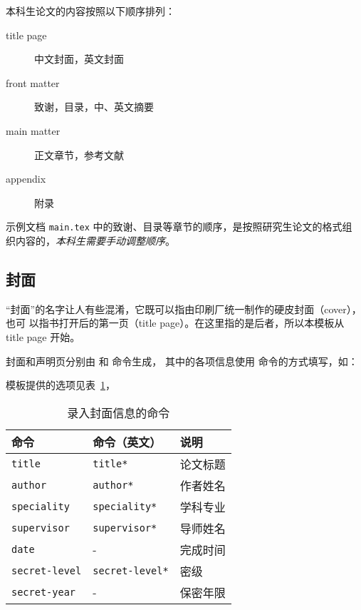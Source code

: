 \documentclass[a4paper]{ltxdoc}
\DeclareRobustCommand\file{\nolinkurl}
\DeclareRobustCommand\opt{\texttt}
\begin{document}
本科生论文的内容按照以下顺序排列：
\begin{description}
  \item[title page] 中文封面，英文封面
  \item[front matter] 致谢，目录，中、英文摘要
  \item[main matter] 正文章节，参考文献
  \item[appendix] 附录
\end{description}

示例文档 \file{main.tex} 中的致谢、目录等章节的顺序，是按照研究生论文的格式组
织内容的，\emph{本科生需要手动调整顺序}。


\subsection{封面}

“封面”的名字让人有些混淆，它既可以指由印刷厂统一制作的硬皮封面（cover），也可
以指书打开后的第一页（title page）。在这里指的是后者，所以本模板从 title page
开始。

\DescribeMacro{\maketitle}
\DescribeMacro{\copyrightpage}
封面和声明页分别由  和  命令生成，
其中的各项信息使用  命令的方式填写，如：
\begin{latex}
\end{latex}
模板提供的选项见表~\ref{tab:covercmds}，
\begin{table}[htb]
  \centering\small
  \caption{录入封面信息的命令}
  \label{tab:covercmds}
  \begin{tabular}{lll}
    \toprule
    命令                & 命令（英文）         & 说明       \\
    \midrule
    \opt{title}         & \opt{title*}         & 论文标题   \\
    \opt{author}        & \opt{author*}        & 作者姓名   \\
    \opt{speciality}    & \opt{speciality*}    & 学科专业   \\
    \opt{supervisor}    & \opt{supervisor*}    & 导师姓名   \\
    \opt{date}          & -                    & 完成时间   \\
    \opt{secret-level}  & \opt{secret-level*}  & 密级       \\
    \opt{secret-year}   & -                    & 保密年限   \\
    \bottomrule
  \end{tabular}
\end{table}
\end{document}

